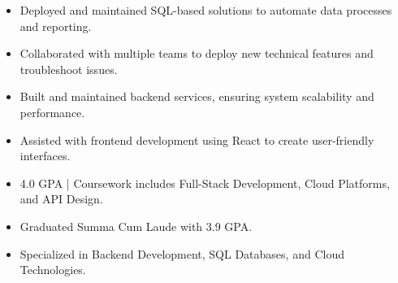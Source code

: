 \par\smallskip
\noindent
\begin{minipage}{20cm}
  \begin{minipage}{9.75cm}
    \begin{itemize}
      \item Deployed and maintained SQL-based solutions to automate data processes and reporting.
      \item Collaborated with multiple teams to deploy new technical features and troubleshoot issues.
    \end{itemize}
  \end{minipage}
  \hfill
  \begin{minipage}{9.75cm}
    \begin{itemize}
      \item Built and maintained backend services, ensuring system scalability and performance.
      \item Assisted with frontend development using React to create user-friendly interfaces.
    \end{itemize}
  \end{minipage}
\end{minipage}
\par\smallskip
\divider

\begin{itemize}
  \item 4.0 GPA | Coursework includes Full-Stack Development, Cloud Platforms, and API Design.
\end{itemize}
\divider

\begin{itemize}
  \item Graduated Summa Cum Laude with 3.9 GPA.
  \item Specialized in Backend Development, SQL Databases, and Cloud Technologies.
\end{itemize}

\noindent
\begin{minipage}{20cm}
\end{minipage}


